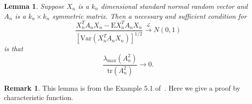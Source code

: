 \documentclass[review]{elsarticle}
\theoremstyle{plain}
\newtheorem{lemma}{\quad\quad Lemma}
\theoremstyle{definition}
\newtheorem{remark}{\quad\quad Remark}
\theoremstyle{remark}
\begin{document}
\begin{lemma}\label{quadraticFormCLT}
    Suppose $X_{n}$ is a $k_n$ dimensional standard normal random vector and $A_n$ is a $k_n\times k_n$ symmetric matrix. Then a necessary and sufficient condition for
    \begin{equation}\label{quadratic}
        \frac{X_n^T A_n X_n-\mathrm{E}X_n^T A_n X_n}{{[\mathrm{Var}(X_n^T A_n X_n)]}^{1/2}}\xrightarrow{\mathcal{L}}N(0,1)
    \end{equation}
    is that
    \begin{equation}\label{quadraticEigen}
        \frac{\lambda_{\max}(A_n^2)}{\mathrm{tr}(A_n^2)}\to 0.
    \end{equation}
\end{lemma}
\begin{remark}
This lemma is from the Example 5.1 of~\cite{jiang1996reml}. Here we give a proof by characteristic function.
\end{remark}
\end{document}
